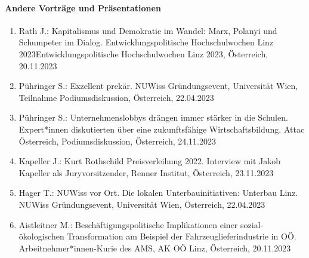     \paragraph{Andere Vorträge und Präsentationen}
\begin{enumerate}
	\item Rath J.: Kapitalismus und Demokratie im Wandel: Marx, Polanyi und Schumpeter im Dialog. Entwicklungspolitische Hochschulwochen Linz 2023Entwicklungspolitische Hochschulwochen Linz 2023, Österreich, 20.11.2023
	\item Pühringer S.: Exzellent prekär. NUWiss Gründungsevent, Universität Wien, Teilnahme Podiumsdiskussion, Österreich, 22.04.2023
	\item Pühringer S.: Unternehmenslobbys drängen immer stärker in die Schulen. Expert*innen diskutierten über eine zukunftsfähige Wirtschaftsbildung. Attac Österreich, Podiumsdiskussion, Österreich, 24.11.2023
	\item Kapeller J.: Kurt Rothschild Preisverleihung 2022. Interview mit Jakob Kapeller als Juryvorsitzender, Renner Institut, Österreich, 23.11.2023
	\item Hager T.: NUWiss vor Ort. Die lokalen Unterbauinitiativen: Unterbau Linz. NUWiss Gründungsevent, Universität Wien, Österreich, 22.04.2023
	\item Aistleitner M.: Beschäftigungspolitische Implikationen einer sozial-ökologischen Transformation am Beispiel der Fahrzeuglieferindustrie in OÖ. Arbeitnehmer*innen-Kurie des AMS, AK OÖ Linz, Österreich, 20.11.2023
\end{enumerate}
